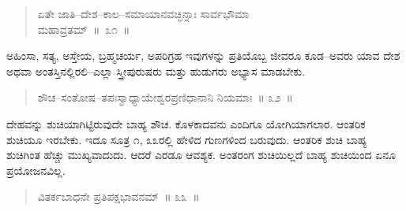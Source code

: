 \vspace{-0.2cm}

\begin{verse}
ಏತೇ ಜಾತಿ–ದೇಶ–ಕಾಲ–ಸಮಾಯಾನವಚ್ಛಿನ್ನಾಃ ಸಾರ್ವಭೌಮಾ \\ಮಹಾವ್ರತಮ್​~॥~೩೧~॥
\end{verse}

\vspace{-0.4cm}


\vspace{0.1cm}

ಅಹಿಂಸಾ, ಸತ್ಯ, ಅಸ್ತೇಯ, ಬ್ರಹ್ಮಚರ್ಯ, ಅಪರಿಗ್ರಹ ಇವುಗಳನ್ನು ಪ್ರತಿಯೊಬ್ಬ ಜೀವರೂ ಕೂಡ–ಅವರು ಯಾವ ದೇಶ ಅಥವಾ ಅಂತಸ್ತಿನಲ್ಲಿರಲಿ–ಎಲ್ಲಾ ಸ್ತ್ರೀಪುರುಷರು ಮತ್ತು ಹುಡುಗರು ಅಭ್ಯಾಸ ಮಾಡಬೇಕು. 

\vspace{-0.2cm}

\begin{verse}
ಶೌಚ–ಸಂತೋಷ–ತಪಃಸ್ವಾಧ್ಯಾಯೇಶ್ವರಪ್ರಣಿಧಾನಾನಿ ನಿಯಮಾಃ~॥ ೩೨~॥
\end{verse}

\vspace{-0.4cm}



\vfill\eject

ದೇಹವನ್ನು ಶುಚಿಯಾಗಿಟ್ಟಿರುವುದೇ ಬಾಹ್ಯ ಶೌಚ. ಕೊಳಕಾದವನು ಎಂದಿಗೂ ಯೋಗಿಯಾಗಲಾರ. ಆಂತರಿಕ ಶುಚಿಯೂ ಇರಬೇಕು. ಇದೂ ಸೂತ್ರ ೧, ೩೩ರಲ್ಲಿ ಹೇಳಿದ ಗುಣಗಳಿಂದ ಬರುವುದು. ಆಂತರಿಕ ಶುಚಿ ಬಾಹ್ಯ ಶುಚಿಗಿಂತ ಹೆಚ್ಚು ಮುಖ್ಯವಾದುದು. ಆದರೆ ಎರಡೂ ಆವಶ್ಯಕ. ಅಂತರಂಗ ಶುಚಿಯಿಲ್ಲದೆ ಬಾಹ್ಯ ಶುಚಿಯಿಂದ ಏನೂ ಪ್ರಯೋಜನವಿಲ್ಲ. 

\vspace{-0.2cm}

\begin{verse}
ವಿತರ್ಕಬಾಧನೇ ಪ್ರತಿಪಕ್ಷಭಾವನಮ್​~॥ ೩೩~॥
\end{verse}

\vspace{-0.6cm}


\vspace{0.1cm}

